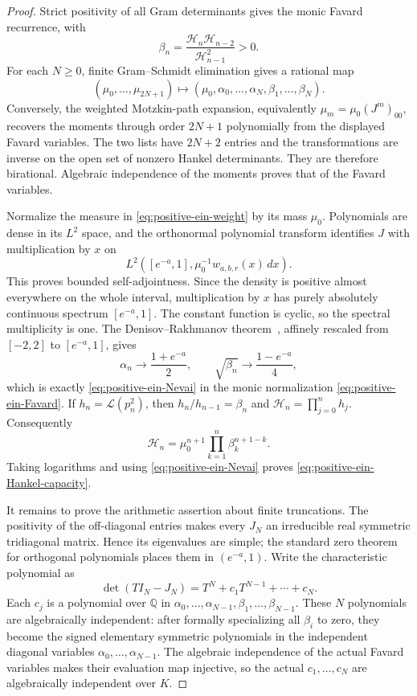 \documentclass[11pt]{article}
\theoremstyle{definition}
\theoremstyle{remark}
\begin{document}
\begin{proof}
Strict positivity of all Gram determinants gives the monic Favard
recurrence, with
\begin{equation}\label{eq:positive-ein-beta-Hankel}
 \beta_n=\frac{\mathcal H_n\mathcal H_{n-2}}
 {\mathcal H_{n-1}^2}>0.
\end{equation}
For each $N\geq0$, finite Gram--Schmidt elimination gives a rational map
\[
 (\mu_0,\ldots,\mu_{2N+1})
 \longmapsto
 (\mu_0,\alpha_0,\ldots,\alpha_N,
             \beta_1,\ldots,\beta_N).
\]
Conversely, the weighted Motzkin-path expansion, equivalently
$\mu_m=\mu_0(J^m)_{00}$, recovers the moments through order $2N+1$
polynomially from the displayed Favard variables.  The two lists have
$2N+2$ entries and the transformations are inverse on the open set of
nonzero Hankel determinants.  They are therefore birational.  Algebraic
independence of the moments proves that of the Favard variables.

Normalize the measure in \eqref{eq:positive-ein-weight} by its mass
$\mu_0$.  Polynomials are dense in its $L^2$ space, and the orthonormal
polynomial transform identifies $J$ with multiplication by $x$ on
\[
 L^2\!\left([e^{-a},1],\mu_0^{-1}w_{a,b,r}(x)\,dx\right).
\]
This proves bounded self-adjointness.  Since the density is positive
almost everywhere on the whole interval, multiplication by $x$ has
purely absolutely continuous spectrum $[e^{-a},1]$.  The constant
function is cyclic, so the spectral multiplicity is one.  The
Denisov--Rakhmanov theorem~\cite{Denisov2004}, affinely rescaled from $[-2,2]$ to
$[e^{-a},1]$, gives
\[
 \alpha_n\to\frac{1+e^{-a}}2,
 \qquad
 \sqrt{\beta_n}\to\frac{1-e^{-a}}4,
\]
which is exactly \eqref{eq:positive-ein-Nevai} in the monic
normalization \eqref{eq:positive-ein-Favard}.
If $h_n=\mathcal L(p_n^2)$, then
$h_n/h_{n-1}=\beta_n$ and
$\mathcal H_n=\prod_{j=0}^nh_j$.  Consequently
\[
 \mathcal H_n
 =\mu_0^{n+1}\prod_{k=1}^n\beta_k^{n+1-k}.
\]
Taking logarithms and using \eqref{eq:positive-ein-Nevai} proves
\eqref{eq:positive-ein-Hankel-capacity}.

It remains to prove the arithmetic assertion about finite truncations.
The positivity of the off-diagonal entries makes every $J_N$ an
irreducible real symmetric tridiagonal matrix.  Hence its eigenvalues are
simple; the standard zero theorem for orthogonal polynomials places them
in $(e^{-a},1)$.  Write the characteristic polynomial as
\[
 \det(TI_N-J_N)=T^N+c_1T^{N-1}+\cdots+c_N.
\]
Each $c_j$ is a polynomial over $\mathbb Q$ in
$\alpha_0,\ldots,\alpha_{N-1},\beta_1,\ldots,\beta_{N-1}$.
These $N$ polynomials are algebraically independent: after formally
specializing all $\beta_i$ to zero, they become the signed elementary
symmetric polynomials in the independent diagonal variables
$\alpha_0,\ldots,\alpha_{N-1}$.  The algebraic independence of the
actual Favard variables makes their evaluation map injective, so the
actual $c_1,\ldots,c_N$ are algebraically independent over $K$.


\end{proof}
\end{document}
